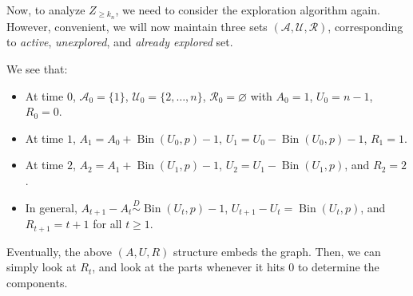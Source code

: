 Now, to analyze \(Z_{\geq k_n}\), we need to consider the exploration algorithm again. However, convenient, we will now maintain three sets \((\mathcal{A} , \mathcal{U} , \mathcal{R} )\), corresponding to \emph{active}, \emph{unexplored}, and \emph{already explored} set.

\begin{intuition}
	We see that:
	\begin{itemize}
		\item At time \(0\), \(\mathcal{A} _0 = \{ 1 \} \), \(\mathcal{U} _0 = \{ 2, \dots , n \} \), \(\mathcal{R} _0 = \varnothing \) with \(A_0 = 1\), \(U_0 = n-1\), \(R_0 = 0\).
		\item At time \(1\), \(A_1 = A_0 + \operatorname{Bin}(U_0, p) - 1\), \(U_1 = U_0 - \operatorname{Bin}(U_0, p) - 1\), \(R_1 = 1\).
		\item At time \(2\), \(A_2 = A_1 + \operatorname{Bin}(U_1, p) - 1\), \(U_2 = U_1 - \operatorname{Bin}(U_1, p) \), and \(R_2 = 2\).
		\item In general, \(A_{t+1} - A_t \overset{D}{\sim } \operatorname{Bin}(U_t, p) - 1 \), \(U_{t+1} - U_t = \operatorname{Bin}(U_t, p) \), and \(R_{t+1} = t+1\) for all \(t \geq 1\).
	\end{itemize}
	Eventually, the above \((A, U, R)\) structure embeds the graph. Then, we can simply look at \(R_t\), and look at the parts whenever it hits \(0\) to determine the components.
\end{intuition}